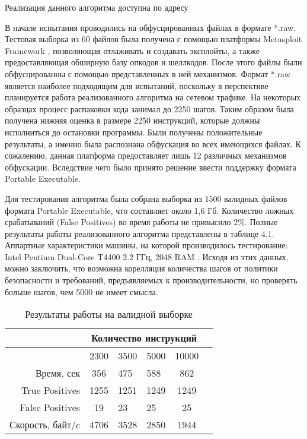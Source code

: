 \documentclass[oneside, final, 14pt]{extreport}
\begin{document}
Реализация данного алгоритма доступна по адресу

В начале испытания проводились на обфусцированных файлах в формате *.raw. Тестовая выборка из 60 файлов была получена с помощью платформы Metasploit Framework \cite{meta}, позволяющая отлаживать и создавать эксплойты, а также предоставляющая обширную базу опкодов и шеллкодов. После этого файлы были обфусцированны с помощью представленных в ней механизмов. Формат *.raw является наиболее подходящим для испытаний, поскольку в перспективе планируется работа реализованного алгоритма на сетевом трафике. На некоторых образцах процесс распаковки кода занимал до 2250 шагов. Таким образом была получена нижняя оценка в размере 2250 инструкций, которые должны исполниться до остановки программы. Были получены положительные результаты, а именно была распознана обфускация во всех имеющихся файлах. К сожалению, данная платформа предоставляет лишь 12 различных механизмов обфускации. Вследствие чего было принято решение ввести поддержку формата Portable Executable. 

Для тестирования алгоритма была собрана выборка из 1500 валидных файлов формата Portable Executable, что составляет около 1,6 Гб. Количество ложных срабатываний (False Positives) во время работы не привысило 2\%. 
Полные результаты работы реализованного алгоритма представлены в 
таблице 4.1. Аппартные характеристики машины, на которой производилось тестирование: Intel Pentium Dual-Core T4400 2.2 ГГц, 2048 RAM . Исходя из этих данных, можно заключить, что возможна корелляция количества шагов от политики безопасности и требований, предъявляемых к производительности, но проверять больше шагов, чем 5000 не имеет смысла.

\begin{table}[t]
\begin{tabular}{|r|c|p{}|p{}|c|r}
\hline & \multicolumn {4}{c|}{Количество инструкций}\\
\hline & 2300 & 3500 & 5000 & 10000\\
\hline Время, сек & 356 & 475 & 588 & 862\\
\hline True Positives & 1255 & 1251 & 1249 & 1249\\ 
\hline False Positives & 19 & 23 & 25 & 25\\ 
\hline Скорость, байт/c & 4706 & 3528 & 2850 & 1944\\ \hline
\end{tabular}
\caption{Результаты работы на валидной выборке }
\end{table}
\end{document}
